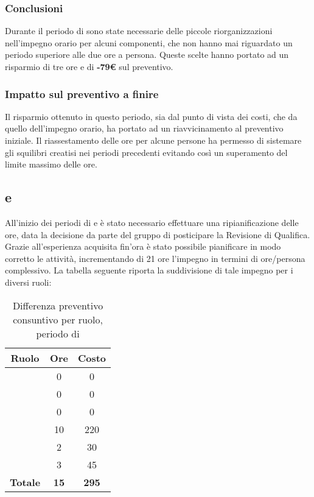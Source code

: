 \subsubsection{Conclusioni}
Durante il periodo di \PA{} sono state necessarie delle piccole riorganizzazioni nell'impegno orario per alcuni componenti, che non hanno mai riguardato un periodo superiore alle due ore a persona.
Queste scelte hanno portato ad un risparmio di tre ore e di \textbf{-79€} sul preventivo.
\subsubsection{Impatto sul preventivo a finire}
Il risparmio ottenuto in questo periodo, sia dal punto di vista dei costi, che da quello dell'impegno orario, ha portato ad un riavvicinamento al preventivo iniziale. Il riassestamento delle ore per alcune persone ha permesso di sistemare gli squilibri creatisi nei periodi precedenti evitando così un superamento del limite massimo delle ore.

\subsection{\PD{} e \Cod{}}
All'inizio dei periodi di \PD{} e \Cod{} è stato necessario effettuare una ripianificazione delle ore, data la decisione da parte del gruppo di posticipare la Revisione di Qualifica. Grazie all'esperienza acquisita fin'ora è stato possibile pianificare in modo corretto le attività, incrementando di 21 ore l'impegno in termini di ore/persona complessivo. La tabella seguente riporta la suddivisione di tale impegno per i diversi ruoli:
\begin{table}[H]
	\centering
	\begin{tabular}{|c|c|c|}
		\hline
		\textbf{Ruolo} &
		\textbf{Ore} &
		\textbf{Costo} \\
		\hline
		\Responsabile & 0 & 0\\
		\hline
		\Amministratore & 0 & 0\\
		\hline
		\Analista & 0 & 0\\
		\hline
		\Progettista & 10 & 220 \\
		\hline
		\Verificatore & 2 & 30 \\
		\hline
		\Programmatore & 3 & 45 \\
		\hline
		\textbf{Totale} & \textbf{15} & \textbf{295} \\
		\hline
	\end{tabular}
	\caption{Differenza preventivo consuntivo per ruolo, periodo di \PA}
\end{table}

